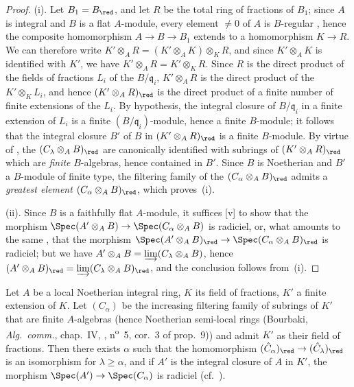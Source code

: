 \begin{proof}
\medskip\noindent
(i).
Let $B_1=B_\red$, and let $R$ be the total ring of fractions of $B_1$; since $A$ is integral and $B$ is a flat $A$-module, every element $\neq 0$ of $A$ is $B$-regular , hence the composite homomorphism $A\to B\to B_1$ extends to a homomorphism $K\to R$. We can therefore write $K'\otimes_A R=(K'\otimes_A K)\otimes_K R$, and since $K'\otimes_A K$ is identified with $K'$, we have $K'\otimes_A R=K'\otimes_K R$. Since $R$ is the direct product of the fields of fractions $L_i$ of the $B/\mathfrak{q}_i$, $K'\otimes_A R$ is the direct product of the $K'\otimes_K L_i$, and hence $(K'\otimes_A R)_\red$ is the direct product of a finite number of finite extensions of the $L_i$. By hypothesis, the integral closure of $B/\mathfrak{q}_i$ in a finite extension of $L_i$ is a finite $(B/\mathfrak{q}_i)$-module, hence a finite $B$-module; it follows that the integral closure $B'$ of $B$ in $(K'\otimes_A R)_\red$ is a finite $B$-module.
By virtue of , the $(C_\lambda\otimes_A B)_\red$ are canonically identified with subrings of $(K'\otimes_A R)_\red$ which are \emph{finite} $B$-algebras, hence contained in $B'$.
Since $B$ is Noetherian and $B'$ a $B$-module of finite type, the filtering family of the $(C_\alpha\otimes_A B)_\red$ admits a \emph{greatest element} $(C_\alpha\otimes_A B)_\red$, which proves~(i).

\medskip\noindent
(ii).
Since $B$ is a faithfully flat $A$-module, it suffices [v] to show that the morphism $\Spec(A'\otimes_A B)\to\Spec(C_\alpha\otimes_A B)$ is radiciel, or, what amounts to the same , that the morphism $\Spec(A'\otimes_A B)_\red\to\Spec(C_\alpha\otimes_A B)_\red$ is radiciel; but we have $A'\otimes_A B=\varinjlim(C_\lambda\otimes_A B)$, hence  $(A'\otimes_A B)_\red=\varinjlim(C_\lambda\otimes_A B)_\red$, and the conclusion follows from~(i).
\end{proof}

\begin{corollary}[23.2.5]
\label{0.23.2.5}
Let $A$ be a local Noetherian integral ring, $K$ its field of fractions, $K'$ a finite extension of $K$.
Let $(C_\alpha)$ be the increasing filtering family of subrings of $K'$ that are finite $A$-algebras (hence Noetherian semi-local rings \textnormal{(Bourbaki, \emph{Alg.~comm.}, chap.~IV, , n\textsuperscript{o}~5, cor.~3 of prop.~9)}) and admit $K'$ as their field of fractions.
Then there exists $\alpha$ such that the homomorphism $(\hat{C}_\alpha)_\red\to(\hat{C}_\lambda)_\red$ is an isomorphism for $\lambda\geq\alpha$, and if $A'$ is the integral closure of $A$ in $K'$, the morphism $\Spec(A')\to\Spec(C_\alpha)$ is radiciel \textnormal{(cf.~)}.
\end{corollary}

